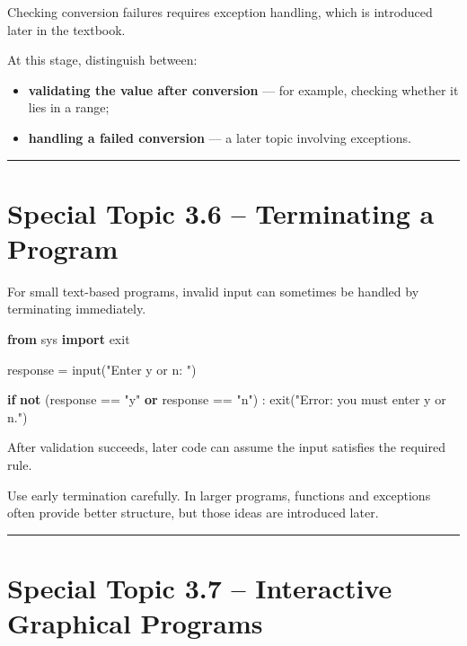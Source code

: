 \documentclass[
  11pt,
  a4paper,
]{article}
\newenvironment{Shaded}{}{}
\newcommand{\BuiltInTok}[1]{\textcolor[rgb]{0.00,0.50,0.00}{#1}}
\newcommand{\ControlFlowTok}[1]{\textcolor[rgb]{0.00,0.44,0.13}{\textbf{#1}}}
\newcommand{\ImportTok}[1]{\textcolor[rgb]{0.00,0.50,0.00}{\textbf{#1}}}
\newcommand{\KeywordTok}[1]{\textcolor[rgb]{0.00,0.44,0.13}{\textbf{#1}}}
\newcommand{\NormalTok}[1]{#1}
\newcommand{\OperatorTok}[1]{\textcolor[rgb]{0.40,0.40,0.40}{#1}}
\newcommand{\StringTok}[1]{\textcolor[rgb]{0.25,0.44,0.63}{#1}}
\providecommand{\tightlist}{%
  \setlength{\itemsep}{0pt}\setlength{\parskip}{0pt}}
\begin{document}
Checking conversion failures requires exception handling, which is
introduced later in the textbook.

At this stage, distinguish between:

\begin{itemize}
\tightlist
\item
  \textbf{validating the value after conversion} --- for example,
  checking whether it lies in a range;
\item
  \textbf{handling a failed conversion} --- a later topic involving
  exceptions.
\end{itemize}

\begin{center}\rule{0.5\linewidth}{0.5pt}\end{center}

\section{Special Topic 3.6 -- Terminating a
Program}\label{special-topic-3.6-terminating-a-program}

For small text-based programs, invalid input can sometimes be handled by
terminating immediately.

\begin{Shaded}
\begin{Highlighting}[]
\ImportTok{from}\NormalTok{ sys }\ImportTok{import}\NormalTok{ exit}

\NormalTok{response }\OperatorTok{=} \BuiltInTok{input}\NormalTok{(}\StringTok{"Enter y or n: "}\NormalTok{)}

\ControlFlowTok{if} \KeywordTok{not}\NormalTok{ (response }\OperatorTok{==} \StringTok{"y"} \KeywordTok{or}\NormalTok{ response }\OperatorTok{==} \StringTok{"n"}\NormalTok{) :}
\NormalTok{    exit(}\StringTok{"Error: you must enter y or n."}\NormalTok{)}
\end{Highlighting}
\end{Shaded}

After validation succeeds, later code can assume the input satisfies the
required rule.

Use early termination carefully. In larger programs, functions and
exceptions often provide better structure, but those ideas are
introduced later.

\begin{center}\rule{0.5\linewidth}{0.5pt}\end{center}

\section{Special Topic 3.7 -- Interactive Graphical
Programs}\label{special-topic-3.7-interactive-graphical-programs}
\end{document}
